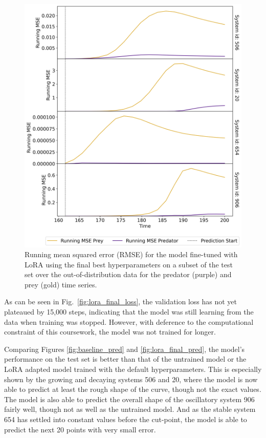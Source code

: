 \documentclass[11pt,a4paper]{article}
\begin{document}
\begin{figure}
    \centering
    \includegraphics[width=\columnwidth, keepaspectratio]{../plots/running_mse_lora_final.png}
    \caption{Running mean squared error (RMSE) for the model fine-tuned with LoRA using the final best hyperparameters on a subset of the test set over the out-of-distribution data for the predator (purple) and prey (gold) time series.}
    \label{fig:lora_final_rmse}
\end{figure}

As can be seen in Fig.~\ref{fig:lora_final_loss}, the validation loss has not yet plateaued by 15,000 steps, indicating that the model was still learning from the data when training was stopped. However, with deference to the computational constraint of this coursework, the model was not trained for longer.

Comparing Figures \ref{fig:baseline_pred} and \ref{fig:lora_final_pred}, the model's performance on the test set is better than that of the untrained model or the LoRA adapted model trained with the default hyperparameters. This is especially shown by the growing and decaying systems 506 and 20, where the model is now able to predict at least the rough shape of the curve, though not the exact values. The model is also able to predict the overall shape of the oscillatory system 906 fairly well, though not as well as the untrained model. And as the stable system 654 has settled into constant values before the cut-point, the model is able to predict the next 20 points with very small error.
\end{document}
